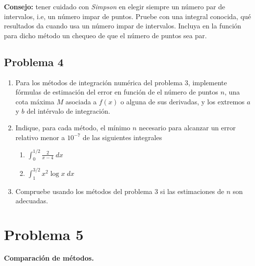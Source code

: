 \documentclass[11pt]{article}
\begin{document}
\textbf{Consejo:} tener cuidado con \emph{Simpson} en elegir siempre un
número par de intervalos, i.e, un número impar de puntos. Pruebe con una
integral conocida, qué resultados da cuando usa un número impar de
intervalos. Incluya en la función para dicho método un chequeo de que el
número de puntos sea par.

    \hypertarget{problema-4}{%
\subsection{Problema 4}\label{problema-4}}

\begin{enumerate}
\def\labelenumi{\arabic{enumi}.}
\item
  Para los métodos de integración numérica del problema 3, implemente
  fórmulas de estimación del error en función de el número de puntos
  \(n\), una cota máxima \(M\) asociada a \(f(x)\) o alguna de sus
  derivadas, y los extremos \(a\) y \(b\) del intérvalo de integración.
\item
  Indique, para cada método, el mínimo \(n\) necesario para alcanzar un
  error relativo menor a \(10^{-7}\) de las siguientes integrales

  \begin{enumerate}
  \def\labelenumii{\alph{enumii}.}
  \item
    \(\int_0^{1/2} \frac{2}{x-4} \; dx\)
  \item
    \(\int_1^{3/2} x^2 \log x \; dx\)
  \end{enumerate}
\item
  Compruebe usando los métodos del problema 3 si las estimaciones de
  \(n\) son adecuadas.
\end{enumerate}

    \hypertarget{problema-5}{%
\section{Problema 5}\label{problema-5}}

\textbf{Comparación de métodos.}
\end{document}
